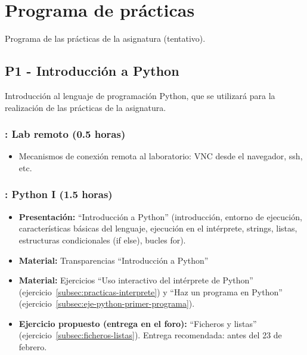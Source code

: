 \documentclass[a4paper,12pt]{article}
\begin{document}
\section{Programa de prácticas}

Programa de las prácticas de la asignatura (tentativo).

\subsection{P1 - Introducción a Python}

Introducción al lenguaje de programación Python, que se utilizará para la realización de las prácticas de la asignatura.

\subsubsection{\martesB: Lab remoto (0.5 horas)}
\label{cal:martesB}

\begin{itemize}
\item Mecanismos de conexión remota al laboratorio: VNC desde el navegador, ssh, etc.
\end{itemize}
\subsubsection{\martesB: Python I (1.5 horas)}
\label{cal:martesBb}

\begin{itemize}
\item \textbf{Presentación:} ``Introducción a Python'' (introducción, entorno de ejecución, características básicas del lenguaje, ejecución en el intérprete, strings, listas, estructuras condicionales (if else), bucles for).
\item \textbf{Material:} Transparencias ``Introducción a Python''
\item \textbf{Material:} Ejercicios ``Uso interactivo del intérprete de Python'' (ejercicio~\ref{subsec:practicas-interprete}) y ``Haz un programa en Python'' (ejercicio~\ref{subsec:eje-python-primer-programa}).
\item \textbf{Ejercicio propuesto (entrega en el foro):} ``Ficheros y listas'' (ejercicio~\ref{subsec:ficheros-listas}).
   Entrega recomendada: antes del 23 de febrero.
\end{itemize}
\end{document}
